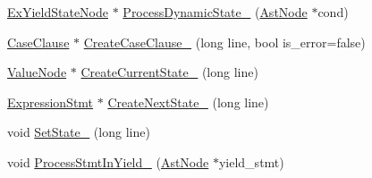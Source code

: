 \begin{DoxyCompactItemize}
\item 
\hyperlink{classmocha_1_1_ex_yield_state_node}{ExYieldStateNode} $\ast$ \hyperlink{classmocha_1_1_yield_helper_ac097dd4fb08a97ba3b87732b25d3339f}{ProcessDynamicState\_\-} (\hyperlink{classmocha_1_1_ast_node}{AstNode} $\ast$cond)
\item 
\hyperlink{classmocha_1_1_case_clause}{CaseClause} $\ast$ \hyperlink{classmocha_1_1_yield_helper_a29c9e2c9955127821f63404a8bf5af9b}{CreateCaseClause\_\-} (long line, bool is\_\-error=false)
\item 
\hyperlink{classmocha_1_1_value_node}{ValueNode} $\ast$ \hyperlink{classmocha_1_1_yield_helper_ae30c71f60d0c2fb9ca1e587b28be79dd}{CreateCurrentState\_\-} (long line)
\item 
\hyperlink{classmocha_1_1_expression_stmt}{ExpressionStmt} $\ast$ \hyperlink{classmocha_1_1_yield_helper_a177ec355cf863481257ba5be72391bc9}{CreateNextState\_\-} (long line)
\item 
void \hyperlink{classmocha_1_1_yield_helper_ad8e0aad8265230105d0700bc55599c74}{SetState\_\-} (long line)
\item 
void \hyperlink{classmocha_1_1_yield_helper_a6056aa60a1d8b916c5e87b790fb38c5a}{ProcessStmtInYield\_\-} (\hyperlink{classmocha_1_1_ast_node}{AstNode} $\ast$yield\_\-stmt)
\end{DoxyCompactItemize}

